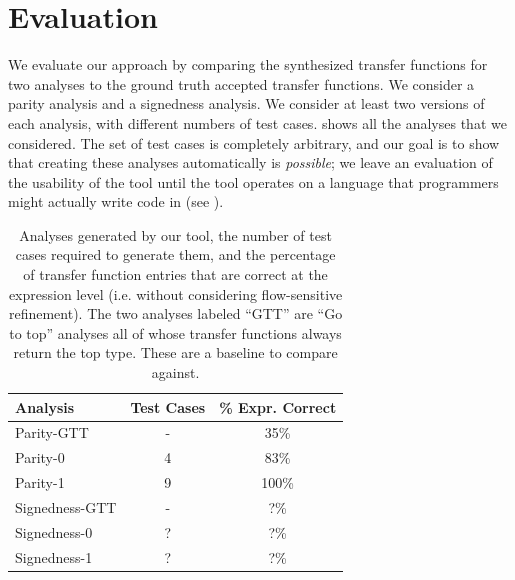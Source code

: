 \documentclass[10pt,conference]{IEEEtran}
\begin{document}
\section{Evaluation}
\label{sec-eval}


We evaluate our approach by comparing the synthesized transfer
functions for two analyses to the ground truth accepted transfer
functions. We consider a parity analysis and a signedness analysis.
We consider at least two versions of each analysis, with different
numbers of test cases.
 shows all the analyses that we considered.
The set of test cases is completely arbitrary,
and our goal is to show that creating these analyses automatically
is \emph{possible}; we leave an evaluation of the usability of the
tool until the tool operates on a language that programmers might
actually write code in (see ).

\begin{table}
\centering
 \begin{tabular}{l c c }
  Analysis & Test Cases & \% Expr. Correct \\ 
  \midrule
  Parity-GTT & - & 35\% \\
  Parity-0 & 4 & 83\% \\
  Parity-1 & 9 & 100\% \\
  \midrule
  Signedness-GTT & - & ?\% \\
  Signedness-0 & ? & ?\% \\
  Signedness-1 & ? & ?\% \\
 \end{tabular}
 \caption{Analyses generated by our tool, the number of test cases
 required to generate them, and the percentage of transfer function
 entries that are correct at the expression level (i.e. without
 considering flow-sensitive refinement). The two analyses labeled
 ``GTT'' are ``Go to top'' analyses all of whose transfer functions
 always return the top type. These are a baseline to compare against.}
 \label{tab-analyses}
\end{table}
\end{document}
